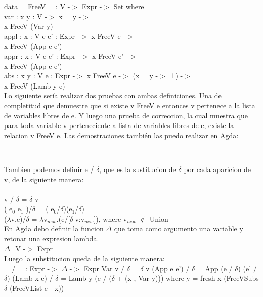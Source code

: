 \documentclass{book}
\begin{document}
data \_ FreeV \_ : V -$>$ Expr -$>$ Set where \\
var : {x y : V} -$>$ x = y -$>$ \\
         x FreeV (Var y) \\
appl : {x : V} {e e' : Expr} -$>$ x FreeV e -$>$ \\
         x FreeV (App e e') \\
appr : {x : V} {e e' : Expr} -$>$ x FreeV e' -$>$ \\
         x FreeV (App e e') \\
abs  : {x y : V} {e : Expr} -$>$ x FreeV e -$>$ (x = y -$>$ $\bot$) -$>$ \\
         x FreeV (Lamb y e) \\


Lo siguiente sería realizar dos pruebas con ambas definiciones. Una de completitud que demuestre que si existe v FreeV e entonces v pertenece a la lista de variables libres de e. Y luego una prueba de correccion, la cual muestra que para toda variable v perteneciente a lista de variables libres de e, existe la relacion v FreeV e.
Las demostraciones también las puedo realizar en Agda:







                             

--------------------------------
                             





Tambien podemos definir e / $\delta$, que es la sustitucion de $\delta$ por cada aparicion de v, de la siguiente manera:
\\ \\
v / $\delta$ = $\delta$ v
\\
( e$_{0}$ e$_{1}$ )/$\delta$ = ( e$_{0}$/$\delta$)(e$_{1}$/$\delta$)
\\
($\lambda$v.e)/$\delta$ = $\lambda$v$_{new}$.(e/[$\delta$$|$v:v$_{new}$]),   where v$_{new}$ $\notin$ Union
\\

En Agda debo definir la funcion $\Delta$ que toma como argumento una variable y retonar una expresion lambda.
\\
$\Delta$=V -$>$ Expr
\\

Luego la substitucion queda de la siguiente manera:
\\
\_ / \_ : Expr -$>$ $\Delta$ -$>$ Expr
Var v / $\delta$ = $\delta$ v
(App e e') / $\delta$ = App (e / $\delta$) (e' / $\delta$)
(Lamb x e) / $\delta$ = Lamb y (e / ($\delta$ + (x , Var y)))
 where y = fresh x (FreeVSubs $\delta$ (FreeVList e - x))
 \\ \\
\end{document}
